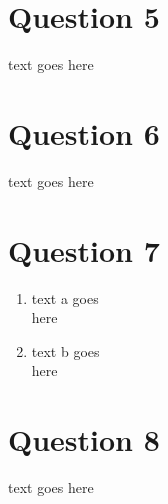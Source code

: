 \documentclass{article}
\begin{document}
\section*{Question 5}
text goes here

\section*{Question 6}
text goes here

\section*{Question 7}
\begin{enumerate}[label=\alph*)]
    \item text a goes\\
        here
    \item text b goes\\
        here
\end{enumerate}

\section*{Question 8}
text goes here
\end{document}
